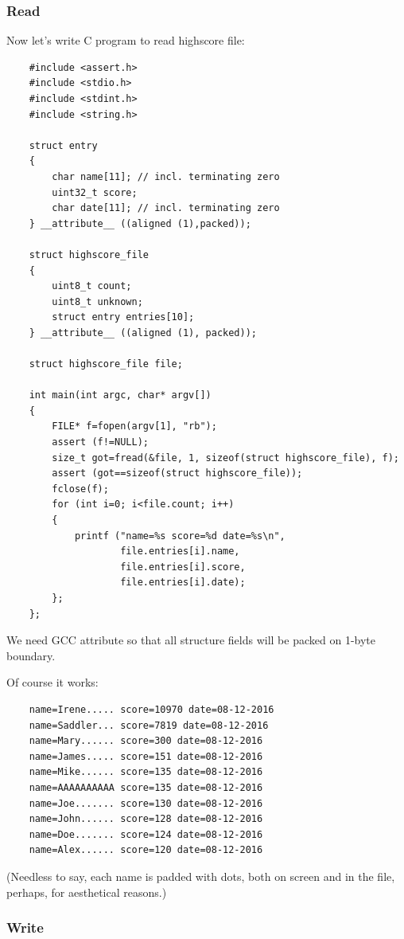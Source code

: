 \subsubsection{Read}

Now let's write C program to read highscore file:

\begin{lstlisting}
	#include <assert.h>
	#include <stdio.h>
	#include <stdint.h>
	#include <string.h>

	struct entry
	{
		char name[11]; // incl. terminating zero
		uint32_t score;
		char date[11]; // incl. terminating zero
	} __attribute__ ((aligned (1),packed));

	struct highscore_file
	{
		uint8_t count;
		uint8_t unknown;
		struct entry entries[10];
	} __attribute__ ((aligned (1), packed));

	struct highscore_file file;

	int main(int argc, char* argv[])
	{
		FILE* f=fopen(argv[1], "rb");
		assert (f!=NULL);
		size_t got=fread(&file, 1, sizeof(struct highscore_file), f);
		assert (got==sizeof(struct highscore_file));
		fclose(f);
		for (int i=0; i<file.count; i++)
		{
			printf ("name=%s score=%d date=%s\n",
					file.entries[i].name,
					file.entries[i].score,
					file.entries[i].date);
		};
	};
\end{lstlisting}

We need GCC  attribute so that all structure fields will be packed on 1-byte boundary.

Of course it works:

\begin{lstlisting}
	name=Irene..... score=10970 date=08-12-2016
	name=Saddler... score=7819 date=08-12-2016
	name=Mary...... score=300 date=08-12-2016
	name=James..... score=151 date=08-12-2016
	name=Mike...... score=135 date=08-12-2016
	name=AAAAAAAAAA score=135 date=08-12-2016
	name=Joe....... score=130 date=08-12-2016
	name=John...... score=128 date=08-12-2016
	name=Doe....... score=124 date=08-12-2016
	name=Alex...... score=120 date=08-12-2016
\end{lstlisting}

(Needless to say, each name is padded with dots, both on screen and in the file, perhaps, for aesthetical reasons.)

\subsubsection{Write}

